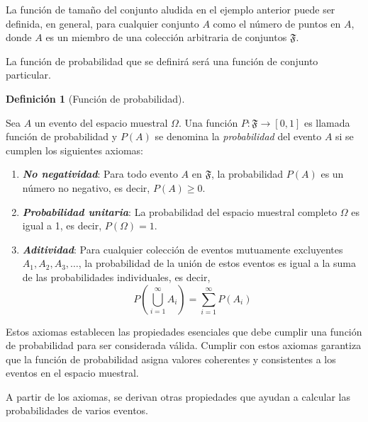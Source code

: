 \documentclass[
  us-letterpaper,
]{scrreprt}
\theoremstyle{definition}
\theoremstyle{plain}
\theoremstyle{plain}
\theoremstyle{definition}
\newtheorem{definition}{Definición}[chapter]
\theoremstyle{remark}
\begin{document}
La función de tamaño del conjunto aludida en el ejemplo anterior puede
ser definida, en general, para cualquier conjunto \(A\) como el número
de puntos en \(A\), donde \(A\) es un miembro de una colección
arbitraria de conjuntos \(\mathfrak{F}\).

La función de probabilidad que se definirá será una función de conjunto
particular.

\begin{definition}[Función de
probabilidad]\protect\hypertarget{def-fprob}{}\label{def-fprob}

Sea \(A\) un evento del espacio muestral \(\Omega\). Una función
\(P: \mathfrak{F} \to [0,1]\) es llamada función de probabilidad y
\(P(A)\) se denomina la \emph{probabilidad} del evento \(A\) si se
cumplen los siguientes axiomas:

\begin{enumerate}
\def\labelenumi{\roman{enumi}.}
\item
  \textbf{\emph{No negatividad}}: Para todo evento \(A\) en
  \(\mathfrak{F}\), la probabilidad \(P(A)\) es un número no negativo,
  es decir, \(P(A) \geq 0\).
\item
  \textbf{\emph{Probabilidad unitaria}}: La probabilidad del espacio
  muestral completo \(\Omega\) es igual a 1, es decir,
  \(P(\Omega) = 1\).
\item
  \textbf{\emph{Aditividad}}: Para cualquier colección de eventos
  mutuamente excluyentes \(A_1, A_2, A_3, \ldots\), la probabilidad de
  la unión de estos eventos es igual a la suma de las probabilidades
  individuales, es decir,
  \[P\left(\bigcup_{i=1}^\infty A_i\right) = \sum_{i=1}^\infty P(A_i)\]
\end{enumerate}

\end{definition}

Estos axiomas establecen las propiedades esenciales que debe cumplir una
función de probabilidad para ser considerada válida. Cumplir con estos
axiomas garantiza que la función de probabilidad asigna valores
coherentes y consistentes a los eventos en el espacio muestral.

A partir de los axiomas, se derivan otras propiedades que ayudan a
calcular las probabilidades de varios eventos.
\end{document}
